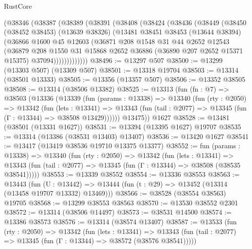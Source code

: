 \begin{lexlean}{RustCore}
\begin{coremodule}
    (@38346
      (@38387
        (@38389
          (@38391
            (@38408
              (@38424
                (@38436
                  (@38449
                    (@38450
                      (@38452 @38453)
                      (@13639 @38326)
                      (@13481
                        @38451
                        @38453
                        (@13644 @38394)
                        (@36866
                          @1600
                          @45
                          @12603
                          (@36871
                            @208
                            @1548
                            @31
                            @44
                            @2652
                            @12543
                            (@36879
                              @208
                              @1550
                              @31
                              @15868
                              @2652
                              @36886
                              (@36890 @207 @2652 @15371 @15375)
                              @37094)))))))))))))
@38496 := @13297 @507
@38500 := @13299 (@13303 @507) (@13309 @507)
@38501 := @13318 @19704
@38503 := @13314 (@38501 @13333)
@38505 := @13356 (@13357 @507)
@38506 := @13352 @38505
@38508 := @13314 (@38506 @13382)
@38525 := @13313
    (fun (fn : @7) =>
    @38503
      (@13336
        (@13339
          (fun (params : @13338) =>
          @13340
            (fun (rty : @2050) =>
            @13342
              (fun (lets : @13341) =>
              @13343 (fun (tail : @2077) => @13345 (fun (Γ : @13344) => @38508 @13429))))))
        @13475))
    @1627
@38528 := @13481 (@38501 (@13331 @1627))
@38531 := @13394 (@13395 @1627) @19707
@38535 := @13314 (@13386 (@38531 @13403) @13407)
@38536 := @13420 @1627
@38541 := @13417 (@13419 @38536 @19710 @13375 @13377)
@38552 := fun (params : @13338) =>
  @13340
    (fun (rty : @2050) =>
    @13342
      (fun (lets : @13341) =>
      @13343 (fun (tail : @2077) => @13345 (fun (Γ : @13344) => @38508 (@38535 @38541)))))
@38553 := @13339 @38552
@38554 := @13336 @38553
@38563 := @13443
    (fun (U : @13442) => @13444 (fun (t : @29) => @13452 (@13314 (@13458 @19707 @13332) @13469)))
@38566 := @38528 (@38554 @38563) @19705
@38568 := @13299 @38553 @38563
@38570 := @13530 @38552 @2301
@38572 := @13314 (@38506 @14497)
@38573 := @38531 @14500
@38574 := @13386 @38573
@38576 := @13314 (@38574 @13407)
@38587 := @13533
    (fun (rty : @2050) =>
    @13342
      (fun (lets : @13341) =>
      @13343 (fun (tail : @2077) => @13345 (fun (Γ : @13344) => @38572 (@38576 @38541)))))

\end{coremodule}
\end{lexlean}
